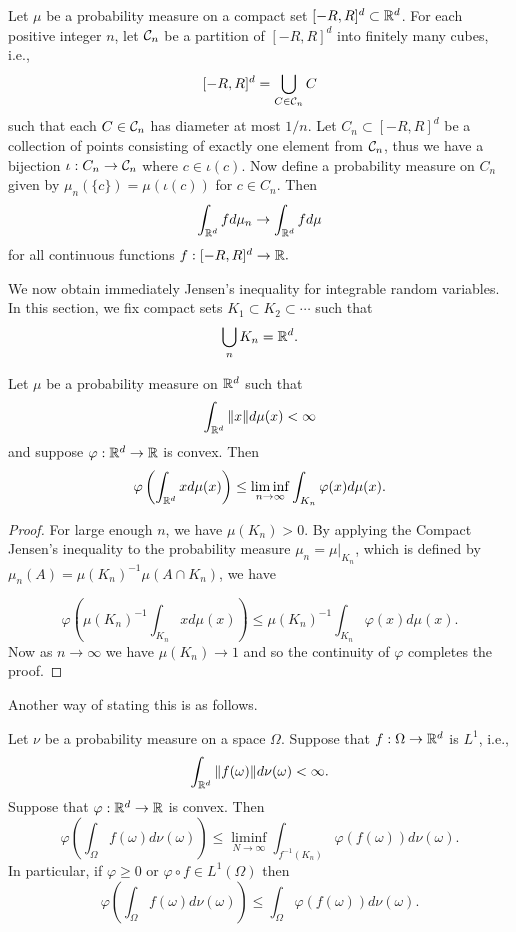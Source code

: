 \documentclass[twoside, a4paper, 10pt]{amsart}
\begin{document}
\begin{prop} Let $\mu$ be a probability measure on a compact set $[-R,R]^d \subset \mathbb{R}^d$. For each positive integer $n$, let $\mathcal{C}_n$ be a partition of $[-R,R]^d$ into finitely many cubes, i.e., $$[-R,R]^d = \bigcup_{C \in \mathcal{C}_n} C$$ such that each $C \in \mathcal{C}_n$ has diameter at most $1/n$. Let $C_n \subset [-R,R]^d$ be a collection of points consisting of exactly one element from $\mathcal{C}_n$, thus we have a bijection $\iota:C_n \to \mathcal{C}_n$ where $c \in \iota(c)$. Now define a probability measure on $C_n$ given by $\mu_n(\{c\}) = \mu(\iota(c))$ for $c \in C_n$. Then $$\int_{\mathbb{R}^d} f d\mu_n \to \int_{\mathbb{R}^d} f d\mu$$ for all continuous functions $f:[-R,R]^d \to \mathbb{R}.$

\end{prop}

We now obtain immediately Jensen's inequality for integrable random variables. In this section, we fix compact sets $K_1 \subset K_2 \subset \cdots$ such that $$\bigcup_{n}K_n = \mathbb{R}^d. $$

\begin{thm} Let $\mu$ be a probability measure  on $\mathbb{R}^d$ such that $$\int_{\mathbb{R}^d} \|x \| d\mu(x) < \infty$$ and suppose $\varphi:\mathbb{R}^d \to \mathbb{R}$ is convex. Then $$\varphi\left(\int_{\mathbb{R}^d} x d\mu(x)\right) \leq \liminf_{n \to \infty} \int_{K_n} \varphi(x) d\mu(x). $$

\end{thm}

\begin{proof} For large enough $n$, we have $\mu(K_n) > 0$. By applying the Compact Jensen's inequality to the probability measure $\mu_n = \mu|_{K_n}$, which is defined by $\mu_n(A) = \mu(K_n)^{-1}\mu(A \cap K_n)$, we have 

$$\varphi\left(\mu(K_n)^{-1}\int_{K_n} x d\mu(x)\right) \leq \mu(K_n)^{-1}\int_{K_n} \varphi(x) d\mu(x). $$ Now as $n \to \infty$ we have $\mu(K_n) \to 1$ and so the continuity of $\varphi$ completes the proof. \end{proof}

Another way of stating this is as follows.

\begin{thm} Let $\nu$ be a probability measure on a space $\Omega$. Suppose that $f:\Omega \to \mathbb{R}^d$ is $L^1$, i.e., $$\int_{\mathbb{R}^d} \|f(\omega)\| d\nu(\omega) < \infty.$$ Suppose that $\varphi:\mathbb{R}^d \to \mathbb{R}$ is convex. Then 
$$\varphi \left(\int_{\Omega} f(\omega) d\nu(\omega) \right) \leq \liminf_{N \to \infty} \int_{f^{-1}(K_n)} \varphi(f(\omega)) d\nu(\omega).$$ 
In particular, if $\varphi \geq 0$ or $\varphi \circ f \in L^1(\Omega)$ then 
$$\varphi \left(\int_{\Omega} f(\omega) d\nu(\omega) \right) \leq \int_{\Omega} \varphi(f(\omega)) d\nu(\omega).$$ 
\end{thm}
\end{document}
